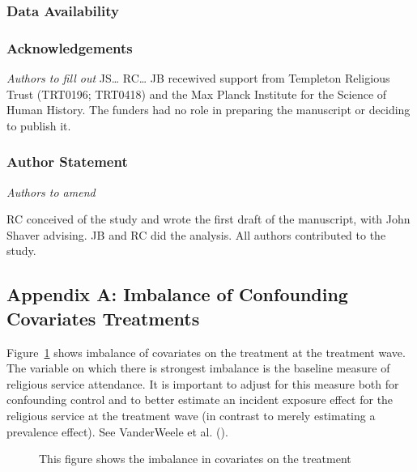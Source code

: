 \documentclass[
  single column]{article}
\begin{document}
\subsubsection{Data Availability}\label{data-availability}

\subsubsection{Acknowledgements}\label{acknowledgements}

\emph{Authors to fill out} JS\ldots{} RC\ldots{} JB recewived support
from Templeton Religious Trust (TRT0196; TRT0418) and the Max Planck
Institute for the Science of Human History. The funders had no role in
preparing the manuscript or deciding to publish it.

\subsubsection{Author Statement}\label{author-statement}

\emph{Authors to amend}

RC conceived of the study and wrote the first draft of the manuscript,
with John Shaver advising. JB and RC did the analysis. All authors
contributed to the study.

\newpage{}

\subsection{Appendix A: Imbalance of Confounding Covariates
Treatments}\label{appendix-exposures}

Figure~\ref{fig-match_1} shows imbalance of covariates on the treatment
at the treatment wave. The variable on which there is strongest
imbalance is the baseline measure of religious service attendance. It is
important to adjust for this measure both for confounding control and to
better estimate an incident exposure effect for the religious service at
the treatment wave (in contrast to merely estimating a prevalence
effect). See VanderWeele et al. ().

\begin{figure}


\caption{\label{fig-match_1}This figure shows the imbalance in
covariates on the treatment}

\end{figure}%
\end{document}
